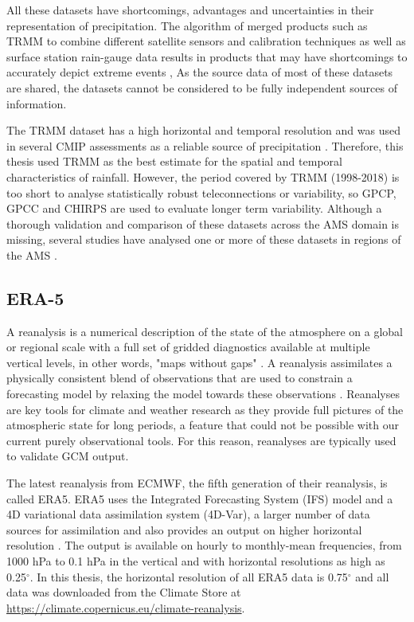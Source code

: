 All these datasets have shortcomings, advantages and uncertainties in their representation of precipitation. The algorithm of merged products such as TRMM to combine different satellite sensors and calibration techniques as well as surface station rain-gauge data results in products that may have shortcomings to accurately depict extreme events \citep{trejo2016}, 
As the source data of most of these datasets are shared, the datasets cannot be considered to be fully independent sources of information. 

The TRMM dataset has a high horizontal and temporal resolution and was used in several CMIP assessments \citep{geil2013,jones2013} as a reliable source of precipitation \citep{carvalho2012}. Therefore, this thesis used TRMM as the best estimate for the spatial and temporal characteristics of rainfall. However,
 the period covered by TRMM (1998-2018) is too short to analyse statistically robust teleconnections or variability, so GPCP, GPCC and CHIRPS are used to evaluate longer term variability.
 Although a thorough validation and comparison of these datasets across the AMS domain is missing, several studies have analysed  one or more of these datasets in regions of the AMS \citep[e.g.][]{franchito2009,dinku2010,trejo2016}.

\subsection{ERA-5}


A reanalysis is a numerical description of the state of the atmosphere on a global or regional scale with a full set of gridded diagnostics available at multiple vertical levels, in other words, "maps without gaps" \citep{era5hersbach}. A reanalysis assimilates a physically consistent blend of observations that are used to constrain a forecasting model by relaxing the model towards these observations \citep[e.g.][]{fujiwara2021}.
Reanalyses are key tools for climate and weather research as they provide full pictures of the atmospheric state for long periods, a feature that could not be possible with our current purely observational tools. For this reason, reanalyses are typically used to validate GCM output. 

The latest reanalysis from ECMWF, the fifth generation of their reanalysis, is called ERA5. 
ERA5 uses the Integrated Forecasting System (IFS) model and a 4D variational data assimilation system (4D-Var), a larger number of data sources for assimilation and also provides an output on higher horizontal resolution \citep{era5hersbach}. The output is available on hourly to monthly-mean frequencies, from 1000 hPa to 0.1 hPa in the vertical and with horizontal resolutions as high as 0.25$^\circ$. In this thesis, the horizontal resolution of all ERA5 data is 0.75$^\circ$ and all data was downloaded from the Climate Store at  \url{https://climate.copernicus.eu/climate-reanalysis}.

